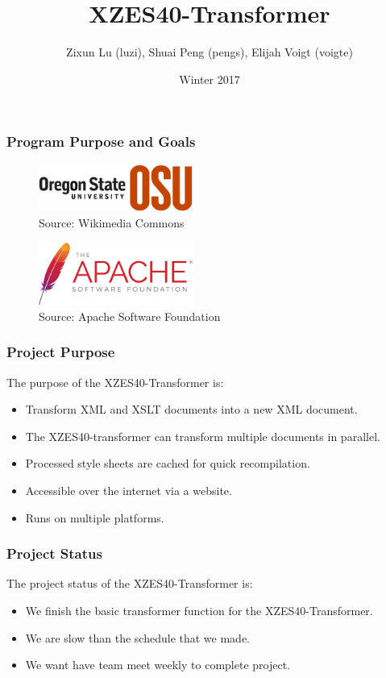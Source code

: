 \documentclass{beamer}
\title{XZES40-Transformer}
\author{Zixun Lu (luzi),
  Shuai Peng (pengs),
  Elijah Voigt (voigte)}
\institute{CS 462 | CS Senior Capstone | Group \#40}
\date{Winter 2017}
\begin{document}
 
\frame{\titlepage}

\begin{frame}
  \frametitle{Program Purpose and Goals }
\begin{figure}
  \centering
    \includegraphics[width=0.45\textwidth]{figures/osu-logo}
    \caption{Source: Wikimedia Commons \cite{osu-logo}}
\end{figure}

\begin{figure}
  \centering
    \includegraphics[width=0.45\textwidth]{figures/asf-logo}
    \caption{Source: Apache Software Foundation \cite{asf-logo}}
\end{figure}
\end{frame}

\begin{frame}
  \frametitle{Project Purpose}
  The purpose of the XZES40-Transformer is:
  \begin{itemize}
  \item Transform XML and XSLT documents into a new XML document.
  \item The XZES40-transformer can transform multiple documents in parallel. 
  \item Processed style sheets are cached for quick recompilation.
  \item Accessible over the internet via a website.
  \item Runs on multiple platforms.
  \end{itemize}
\end{frame}

\begin{frame}
  \frametitle{Project Status}
  The project status of the XZES40-Transformer is:
  \begin{itemize}
    \item We finish the basic transformer function for the XZES40-Transformer.
    \item We are slow than the schedule that we made.
    \item We want have team meet weekly to complete project.
  \end{itemize}
\end{frame}
\end{document}
